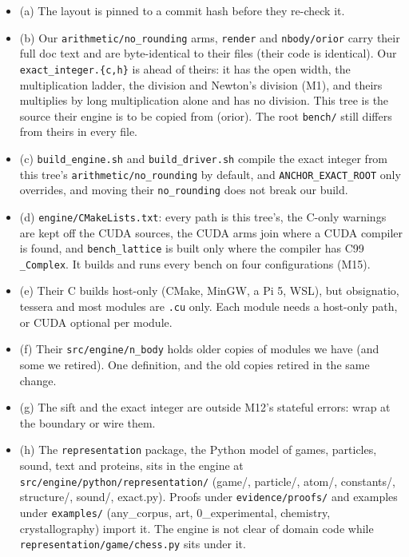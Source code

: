 \begin{enumerate}
\begin{itemize}
\item (a) The layout is pinned to a commit hash before they re-check it.
\item (b) Our \texttt{arithmetic/\allowbreak{}no\_\allowbreak{}rounding} arms, \texttt{render} and \texttt{nbody/\allowbreak{}orior} carry their full doc text and are byte-identical to their files (their code is identical). Our \texttt{exact\_\allowbreak{}integer.\allowbreak{}\{c,h\}} is ahead of theirs: it has the open width, the multiplication ladder, the division and Newton's division (M1), and theirs multiplies by long multiplication alone and has no division. This tree is the source their engine is to be copied from (orior). The root \texttt{bench/\allowbreak{}} still differs from theirs in every file.
\item (c) \texttt{build\_\allowbreak{}engine.\allowbreak{}sh} and \texttt{build\_\allowbreak{}driver.\allowbreak{}sh} compile the exact integer from this tree's \texttt{arithmetic/\allowbreak{}no\_\allowbreak{}rounding} by default, and \texttt{ANCHOR\_\allowbreak{}EXACT\_\allowbreak{}ROOT} only overrides, and moving their \texttt{no\_\allowbreak{}rounding} does not break our build.
\item (d) \texttt{engine/\allowbreak{}CMake\allowbreak{}Lists.\allowbreak{}txt}: every path is this tree's, the C-only warnings are kept off the CUDA sources, the CUDA arms join where a CUDA compiler is found, and \texttt{bench\_\allowbreak{}lattice} is built only where the compiler has C99 \texttt{\_\allowbreak{}Complex}. It builds and runs every bench on four configurations (M15).
\item (e) Their C builds host-only (CMake, MinGW, a Pi 5, WSL), but obsignatio, tessera and most modules are \texttt{.\allowbreak{}cu} only. Each module needs a host-only path, or CUDA optional per module.
\item (f) Their \texttt{src/\allowbreak{}engine/\allowbreak{}n\_\allowbreak{}body} holds older copies of modules we have (and some we retired). One definition, and the old copies retired in the same change.
\item (g) The sift and the exact integer are outside M12's stateful errors: wrap at the boundary or wire them.
\item (h) The \texttt{representation} package, the Python model of games, particles, sound, text and proteins, sits in the engine at \texttt{src/\allowbreak{}engine/\allowbreak{}python/\allowbreak{}representation/\allowbreak{}} (game/, particle/, atom/, constants/, structure/, sound/, exact.py). Proofs under \texttt{evidence/\allowbreak{}proofs/\allowbreak{}} and examples under \texttt{examples/\allowbreak{}} (any\_\allowbreak{}corpus, art, 0\_\allowbreak{}experimental, chemistry, crystallography) import it. The engine is not clear of domain code while \texttt{representation/\allowbreak{}game/\allowbreak{}chess.\allowbreak{}py} sits under it.

\end{itemize}
\end{enumerate}
